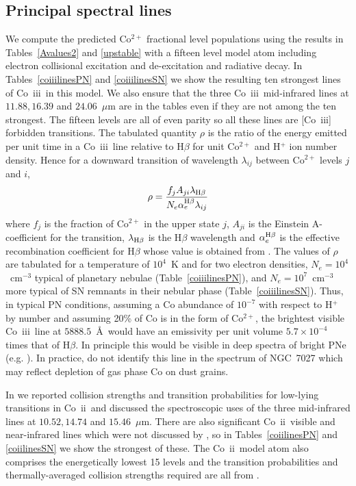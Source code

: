 \documentclass[useAMS,usenatbib]{mn2e}
\newcommand{\II}      {~{\sc ii}}
\newcommand{\III}     {~{\sc iii}}
\begin{document}
\subsection{Principal spectral lines}\label{irratios}

We compute the predicted Co$^{2+}$ fractional level populations using the results in
Tables~\ref{Avalues2} and \ref{upstable} with a fifteen level model atom including electron
collisional excitation and de-excitation and radiative decay. In Tables~\ref{coiiilinesPN} and
\ref{coiiilinesSN} we show the resulting ten strongest lines of Co\III\ in this model. We also
ensure that the three Co\III\ mid-infrared lines at $11.88, 16.39$ and $24.06$~$\mu$m are in the
tables even if they are not among the ten strongest. The fifteen levels are all of even parity so
all these lines are [Co\III] forbidden transitions. The tabulated quantity $\rho$ is the ratio of
the energy emitted per unit time in a Co\III\ line relative to H$\beta$ for unit Co$^{2+}$ and
H$^+$ ion number density. Hence for a downward transition of wavelength $\lambda_{ij}$ between
Co$^{2+}$ levels $j$ and $i$,
%
\begin{equation}
\rho = \frac{f_j A_{ji} \lambda_{{\rm H}\beta}}{N_e \alpha_{e}^{{\rm H}\beta} \lambda_{ij}}
\end{equation}
%
where $f_j$ is the fraction of Co$^{2+}$ in the upper state $j$, $A_{ji}$ is the Einstein
A-coefficient for the transition, $\lambda_{{\rm H}\beta}$ is the H$\beta$ wavelength and
$\alpha_{e}^{{\rm H}\beta}$ is the effective recombination coefficient for H$\beta$ whose value is
obtained from \citet{StoreyH95}. The values of $\rho$ are tabulated for a temperature of $10^4$~K
and for two electron densities, $N_e=10^4$~cm$^{-3}$ typical of planetary nebulae
(Table~\ref{coiiilinesPN}), and $N_e=10^7$~cm$^{-3}$ more typical of SN remnants in their nebular
phase (Table~\ref{coiiilinesSN}). Thus, in typical PN conditions, assuming a Co abundance of
$10^{-7}$ with respect to H$^+$ by number and assuming 20\% of Co is in the form of Co$^{2+}$, the
brightest visible Co\III\ line at $5888.5$~\AA\ would have an emissivity per unit volume $5.7\times
10^{-4}$ times that of H$\beta$. In principle this would be visible in deep spectra of bright PNe
(e.g. \citet{BaluteauZMP1995}). In practice, \citet{BaluteauZMP1995} do not identify this line in
the spectrum of NGC~7027 which may reflect depletion of gas phase Co on dust grains.

In \cite{StoreyZS15} we reported collision strengths and transition probabilities for low-lying
transitions in Co\II\ and discussed the spectroscopic uses of the three mid-infrared lines at
$10.52, 14.74$ and $15.46$~$\mu$m. There are also significant Co\II\ visible and near-infrared
lines which were not discussed by \cite{StoreyZS15}, so in Tables~\ref{coiilinesPN} and
\ref{coiilinesSN} we show the strongest of these. The Co\II\ model atom also comprises the
energetically lowest 15 levels and the transition probabilities and thermally-averaged collision
strengths required are all from \cite{StoreyZS15}.
\end{document}
